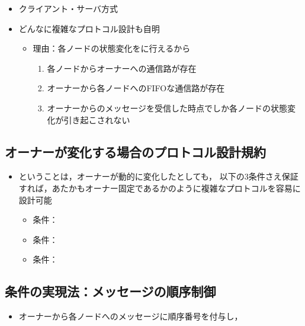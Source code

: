 \documentclass[25pt,landscape,papersize]{jsarticle}
\begin{document}
\begin{itemize}
\item クライアント・サーバ方式
\item どんなに複雑なプロトコル設計も自明
  \begin{itemize}
  \item 理由：各ノードの状態変化をに行えるから
    \begin{enumerate}
    \item 各ノードからオーナーへの通信路が存在
    \item オーナーから各ノードへのFIFOな通信路が存在
    \item オーナーからのメッセージを受信した時点でしか各ノードの状態変化が引き起こされない
    \end{enumerate}
  \end{itemize}
\end{itemize}


\subsection{オーナーが変化する場合のプロトコル設計規約}

\begin{itemize}
\item ということは，オーナーが動的に変化したとしても，
  以下の3条件さえ保証すれば，あたかもオーナー固定であるかのように複雑なプロトコルを容易に設計可能
  \begin{itemize}
  \item 条件\I ：
  \item 条件\II ：
  \item 条件\III ：
  \end{itemize}
\end{itemize}


\subsection{条件\II の実現法：メッセージの順序制御}

\begin{itemize}
\item オーナーから各ノードへのメッセージに順序番号を付与し，
\end{itemize}
\end{document}
